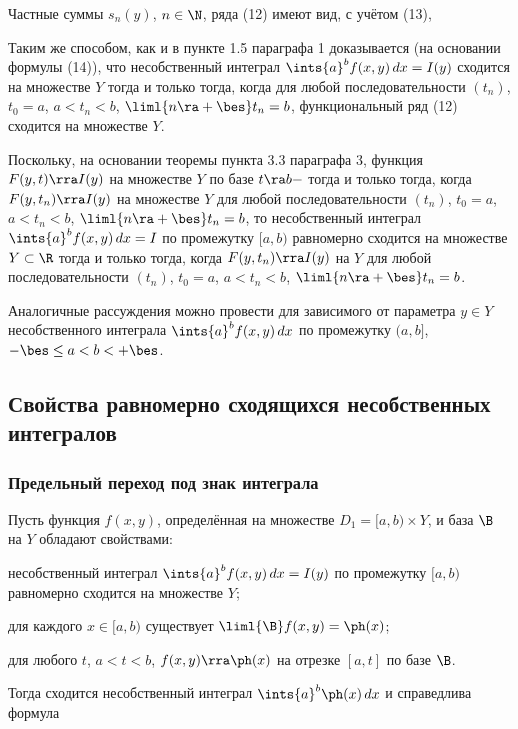 \documentclass[a4paper]{article}
\begin{document}
Частные суммы $s_n(y)$, $n\in\N$, ряда (12) имеют вид, с учётом
(13), 

Таким же способом, как и в пункте 1.5 параграфа 1 доказывается (на
основании формулы (14)), что несобственный интеграл $\ints{a}^b
f(x,y)\,dx=I(y)$ сходится на множестве $Y$ тогда и только тогда,
когда для любой последовательности $(t_n)$, $t_0=a$, $a<t_n<b$,
$\liml{n\ra+\bes}t_n=b$, функциональный ряд (12) сходится на
множестве $Y$.

Поскольку, на основании теоремы пункта 3.3 параграфа 3, функция
$F(y,t)\rra I(y)$ на множестве $Y$ по базе $t\ra b-$ тогда и только
тогда, когда $F(y,t_n)\rra I(y)$ на множестве $Y$ для любой
последовательности $(t_n)$, $t_0=a$, $a<t_n<b$, $\liml{n\ra+\bes}
t_n=b$, то несобственный интеграл $\ints{a}^b f(x,y)\,dx=I$ по
промежутку $[a,b)$ равномерно сходится на множестве $Y\subset\R$
тогда и только тогда, когда $F(y,t_n)\rra I(y)$ на $Y$ для любой
последовательности $(t_n)$, $t_0=a$, $a<t_n<b$,
$\liml{n\ra+\bes}t_n=b$.

Аналогичные рассуждения можно провести для зависимого от параметра
$y\in Y$ несобственного интеграла $\ints{a}^b f(x,y)\,dx$ по
промежутку $(a,b]$, $-\bes\le a < b < +\bes$.

\subsection{Свойства равномерно сходящихся несобственных интегралов}
\subsubsection{Предельный переход под знак интеграла}

\begin{theorem}
Пусть функция $f(x,y)$, определённая на множестве $D_1=[a,b)\times
Y$, и база $\B$ на $Y$ обладают свойствами: \begin{nums}{-2} \item
несобственный интеграл $\ints{a}^b f(x,y)\,dx = I(y)$ по промежутку
$[a,b)$ равномерно сходится на множестве $Y$; \item для каждого
$x\in[a,b)$ существует $\liml{\B}f(x,y) = \ph(x)$; \item для любого
$t$, $a<t<b$, $f(x,y)\rra \ph(x)$ на отрезке $[a,t]$ по базе
$\B$.\end{nums} Тогда сходится несобственный интеграл $\ints{a}^b
\ph(x)\,dx$ и справедлива формула 
\end{theorem}
\end{document}
